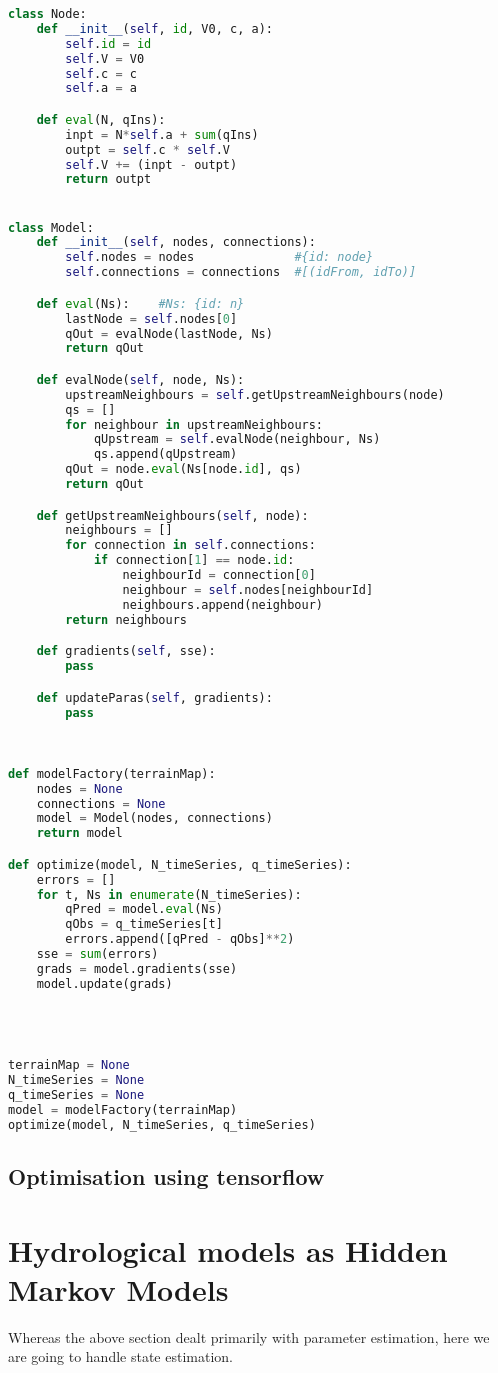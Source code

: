 \begin{lstlisting}[language=python]
class Node:
    def __init__(self, id, V0, c, a):
        self.id = id
        self.V = V0
        self.c = c
        self.a = a

    def eval(N, qIns):
        inpt = N*self.a + sum(qIns)
        outpt = self.c * self.V
        self.V += (inpt - outpt)
        return outpt


class Model:
    def __init__(self, nodes, connections):
        self.nodes = nodes              #{id: node}
        self.connections = connections  #[(idFrom, idTo)]

    def eval(Ns):    #Ns: {id: n}
        lastNode = self.nodes[0]
        qOut = evalNode(lastNode, Ns)
        return qOut

    def evalNode(self, node, Ns):
        upstreamNeighbours = self.getUpstreamNeighbours(node)
        qs = []
        for neighbour in upstreamNeighbours:
            qUpstream = self.evalNode(neighbour, Ns)
            qs.append(qUpstream)
        qOut = node.eval(Ns[node.id], qs)
        return qOut

    def getUpstreamNeighbours(self, node):
        neighbours = []
        for connection in self.connections:
            if connection[1] == node.id:
                neighbourId = connection[0]
                neighbour = self.nodes[neighbourId]
                neighbours.append(neighbour)
        return neighbours

    def gradients(self, sse):
        pass

    def updateParas(self, gradients):
        pass

    
            
def modelFactory(terrainMap):
    nodes = None
    connections = None
    model = Model(nodes, connections)
    return model

def optimize(model, N_timeSeries, q_timeSeries):
    errors = []
    for t, Ns in enumerate(N_timeSeries):
        qPred = model.eval(Ns)
        qObs = q_timeSeries[t]
        errors.append([qPred - qObs]**2)
    sse = sum(errors)
    grads = model.gradients(sse)
    model.update(grads)




terrainMap = None
N_timeSeries = None
q_timeSeries = None
model = modelFactory(terrainMap)
optimize(model, N_timeSeries, q_timeSeries)
\end{lstlisting}


\subsection{Optimisation using tensorflow}



\section{Hydrological models as Hidden Markov Models}
Whereas the above section dealt primarily with parameter estimation, here we are going to handle state estimation. 
